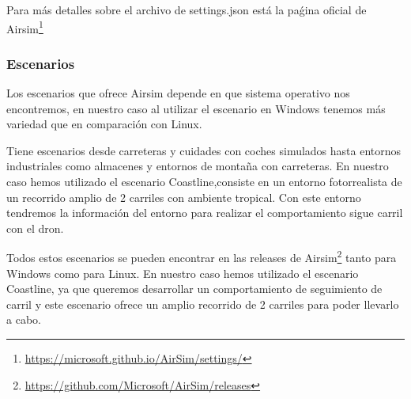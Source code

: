 Para más detalles sobre el archivo de settings.json está la paǵina oficial de Airsim\footnote{\url{https://microsoft.github.io/AirSim/settings/}} \newline

\subsubsection{Escenarios}
\label{sec:airsim}
Los escenarios que ofrece Airsim depende en que sistema operativo nos encontremos, en nuestro caso al utilizar el escenario en Windows 
tenemos más variedad que en comparación con Linux. \newline

Tiene escenarios desde carreteras y cuidades con coches simulados hasta entornos industriales como almacenes y entornos de montaña con carreteras. En nuestro caso
hemos utilizado el escenario Coastline,consiste en un entorno fotorrealista de un recorrido amplio de 2 carriles con ambiente tropical. Con este entorno tendremos la
información del entorno para realizar el comportamiento sigue carril con el dron. \newline

Todos estos escenarios se pueden encontrar en las releases de Airsim\footnote{\url{https://github.com/Microsoft/AirSim/releases}} tanto para Windows como para Linux.
En nuestro caso hemos utilizado el escenario Coastline, ya que queremos desarrollar un comportamiento de seguimiento de carril y este escenario ofrece un amplio recorrido de 2 carriles para poder llevarlo
a cabo.

